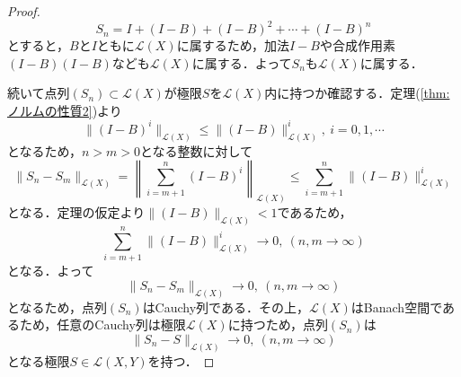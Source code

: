 \documentclass[11pt,a4paper,titlepage]{jsreport}
\theoremstyle{definition}
\begin{document}
\begin{proof}
  \begin{equation*}
    S_n = I + (I-B) + (I-B)^2 + \cdots + (I-B)^n
  \end{equation*}
  とすると，$B$と$I$ともに$\mathcal{L}(X)$に属するため，加法$I-B$や合成作用素$(I-B)(I-B)$なども$\mathcal{L}(X)$に属する．よって$S_n$も$\mathcal{L}(X)$に属する．

  続いて点列$(S_n)\subset\mathcal{L}(X)$が極限$S$を$\mathcal{L}(X)$内に持つか確認する．定理(\ref{thm:ノルムの性質2})より
  \begin{equation*}
    \|(I-B)^i\|_{\mathcal{L}(X)} \leq \|(I-B)\|_{\mathcal{L}(X)}^i,\ i=0,1,\cdots
  \end{equation*}
  となるため，$n>m>0$となる整数に対して
  \begin{equation*}
    \|S_n-S_m\|_{\mathcal{L}(X)} = \left \| \sum^n_{i=m+1}(I-B)^i \right \| _{\mathcal{L}(X)} \leq \sum^n_{i=m+1}\|(I-B)\|^i_{\mathcal{L}(X)}
  \end{equation*}
  となる．定理の仮定より$\|(I-B)\|_{\mathcal{L}(X)}<1$であるため，
  \begin{equation*}
    \sum^n_{i=m+1}\|(I-B)\|^i_{\mathcal{L}(X)} \rightarrow 0,\ (n,m\rightarrow \infty)
  \end{equation*}
  となる．よって
  \begin{equation*}
    \|S_n-S_m\|_{\mathcal{L}(X)} \rightarrow 0,\ (n,m\rightarrow \infty)
  \end{equation*}
  となるため，点列$(S_n)$はCauchy列である．その上，$\mathcal{L}(X)$はBanach空間であるため，任意のCauchy列は極限$\mathcal{L}(X)$に持つため，点列$(S_n)$は
  \begin{equation*}
    \|S_n-S\|_{\mathcal{L}(X)} \rightarrow 0,\ (n,m\rightarrow \infty)
  \end{equation*}
  となる極限$S\in\mathcal{L}(X,Y)$を持つ．


\end{proof}
\end{document}

